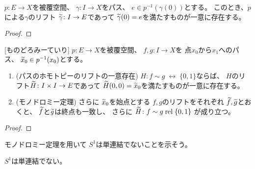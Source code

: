 \documentclass[report]{jlreq}
\begin{document}
\begin{corollary}[パスのリフトの一意存在定理]
    $p \colon E \to X$を被覆空間、
    $\gamma \colon I \to X$をパス、
    $e \in p^{-1}(\gamma(0))$とする。
    このとき、$p$による$\gamma$のリフト
    $\widetilde{\gamma} \colon I \to E$であって
    $\widetilde{\gamma}(0) = e$を満たすものが一意に存在する。
\end{corollary}

\begin{proof}
    \TODO{}
\end{proof}

\begin{corollary}[モノドロミー定理]
    [ものどろみーていり]
    $p \colon E \to X$を被覆空間、
    $f, g \colon I \to X$を
    点$x_0$から$x_1$へのパス、
    $\widetilde{x}_0 \in p^{-1}(x_0)$とする。
    \begin{enumerate}
        \item (パスのホモトピーのリフトの一意存在) \quad
            $H \colon f \sim g \; \rel \; \{ 0, 1 \}$ならば、
            $H$のリフト$\widetilde{H} \colon I \times I \to E$であって
            $\widetilde{H}(0, 0) = \widetilde{x}_0$を満たすものが一意に存在する。
        \item (モノドロミー定理) さらに
            $\widetilde{x}_0$を始点とする
            $f, g$のリフトをそれぞれ
            $\widetilde{f}, \widetilde{g}$とおくと、
            $\widetilde{f}$と$\widetilde{g}$は終点も一致し、
            さらに
            $\widetilde{H} \colon f \sim g \; \mathrm{rel} \; \{ 0, 1 \}$
            が成り立つ。
    \end{enumerate}
\end{corollary}

\begin{proof}
    \TODO{}
\end{proof}

モノドロミー定理を用いて
$S^1$は単連結でないことを示そう。

\begin{theorem}
    $S^1$は単連結でない。
\end{theorem}
\end{document}
